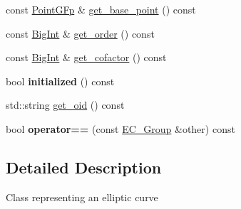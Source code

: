 \begin{DoxyCompactItemize}
const \hyperlink{classBotan_1_1PointGFp}{Point\-G\-Fp} \& \hyperlink{classBotan_1_1EC__Group_aa5dbfd1be34e38470577a34ba1d2fb0f}{get\-\_\-base\-\_\-point} () const 
\item 
const \hyperlink{classBotan_1_1BigInt}{Big\-Int} \& \hyperlink{classBotan_1_1EC__Group_a64e7915cd62226604bcfa0faea627b8e}{get\-\_\-order} () const 
\item 
const \hyperlink{classBotan_1_1BigInt}{Big\-Int} \& \hyperlink{classBotan_1_1EC__Group_a76d6a7fd7a9a39ca5750b21ac4de63b4}{get\-\_\-cofactor} () const 
\item 
\hypertarget{classBotan_1_1EC__Group_a4cab47dc39f92ef4c8f73104c215ff73}{bool {\bfseries initialized} () const }\label{classBotan_1_1EC__Group_a4cab47dc39f92ef4c8f73104c215ff73}

\item 
std\-::string \hyperlink{classBotan_1_1EC__Group_aff4d681d32a66edf1079c965f046e912}{get\-\_\-oid} () const 
\item 
\hypertarget{classBotan_1_1EC__Group_a5720f66181fd3690f61eeb4e070dfa36}{bool {\bfseries operator==} (const \hyperlink{classBotan_1_1EC__Group}{E\-C\-\_\-\-Group} \&other) const }\label{classBotan_1_1EC__Group_a5720f66181fd3690f61eeb4e070dfa36}

\end{DoxyCompactItemize}


\subsection{Detailed Description}
Class representing an elliptic curve 

